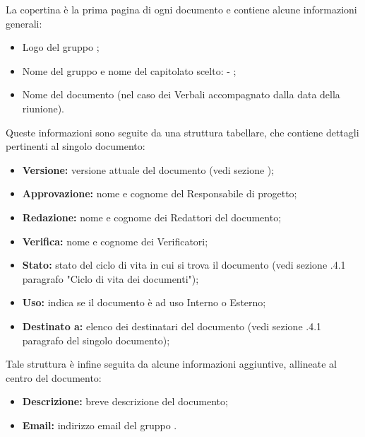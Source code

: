         La copertina è la prima pagina di ogni documento e contiene alcune informazioni generali:
        \begin{itemize}
          \item Logo del gruppo \Gruppo{};
          \item Nome del gruppo e nome del capitolato scelto: \Gruppo{} - \NomeProgetto{};
          \item Nome del documento (nel caso dei Verbali accompagnato dalla data della riunione).
        \end{itemize}
        Queste informazioni sono seguite da una struttura tabellare, che contiene dettagli pertinenti al singolo documento:
        \begin{itemize}
          \item \textbf{Versione:} versione attuale del documento (vedi sezione );%
          \item \textbf{Approvazione:} nome e cognome del Responsabile di progetto;
          \item \textbf{Redazione:} nome e cognome dei Redattori del documento;
          \item \textbf{Verifica:} nome e cognome dei Verificatori;
          \item \textbf{Stato:} stato del ciclo di vita in cui si trova il documento (vedi sezione .4.1 paragrafo "Ciclo di vita dei documenti");
          \item \textbf{Uso:} indica se il documento è ad uso Interno o Esterno;
          \item \textbf{Destinato a:} elenco dei destinatari del documento (vedi sezione .4.1 paragrafo del singolo documento);
    	\end{itemize}
    	Tale struttura è infine seguita da alcune informazioni aggiuntive, allineate al centro del documento:
    	\begin{itemize}
          \item \textbf{Descrizione:} breve descrizione del documento;
          \item \textbf{Email:} indirizzo email del gruppo \Gruppo{}.
   		\end{itemize}

